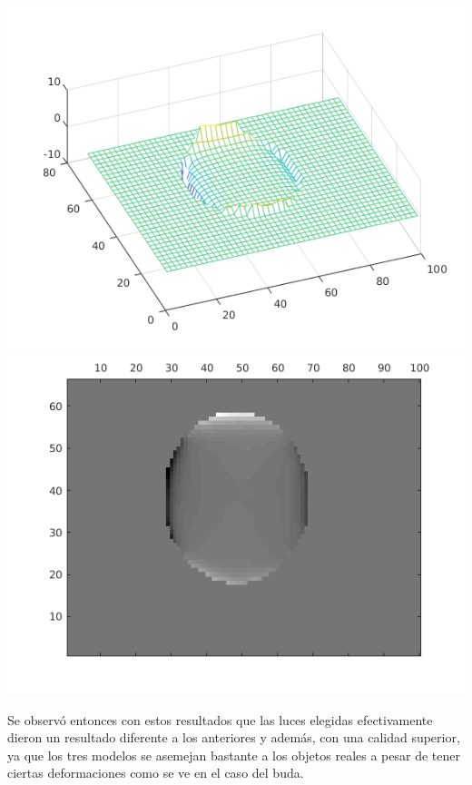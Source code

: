 \includegraphics[width=.4\linewidth]{imagenes/mate_small_model_1511.png}
\includegraphics[width=.4\linewidth]{imagenes/mate_small_dephs_1511.png}

Se observó entonces con estos resultados que las luces elegidas efectivamente dieron un resultado diferente a los anteriores y además, con una calidad superior, ya que los tres modelos se asemejan bastante a los objetos reales a pesar de tener ciertas deformaciones como se ve en el caso del buda.